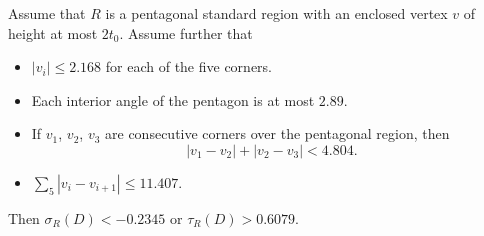 \begin{lemma}\label{lemma:6079}  Assume that $R$ is a pentagonal standard region
    with an enclosed vertex $v$ of height at most $2t_0$.
    Assume further that
    \begin{itemize}
        \item $|v_i|\le 2.168$ for each of the five corners.
        \item Each interior angle of the pentagon is at most
        $2.89$.
        \item If $v_1$, $v_2$, $v_3$ are consecutive corners over
        the pentagonal region, then $$|v_1-v_2|+|v_2-v_3|<4.804.$$
        \item $\sum_5 |v_i-v_{i+1}|\le 11.407.$
    \end{itemize}
    Then $\sigma_R(D)< -0.2345$ or $\tau_R(D) > 0.6079.$
\end{lemma}



